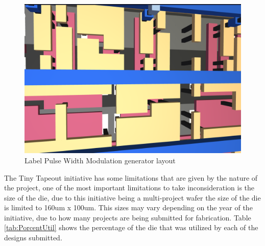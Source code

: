 \begin{figure}[H]
    \centering
        \includegraphics[width=\linewidth]{Pictures/Specific_Layout.png}
    \caption{ Label Pulse Width Modulation generator layout}\label{fig:Specific_Layout}
\end{figure}

The Tiny Tapeout initiative has some limitations that are given by the nature of the project, one of 
the most important limitations to take inconsideration is the size of the die, due to this initiative being 
a multi-project wafer the size of the die is limited to 160um x 100um. This sizes may vary depending on the 
year of the initiative, due to how many projects are being submitted for fabrication. Table \ref*{tab:PorcentUtil}
shows the percentage of the die that was utilized by each of the designs submitted.

\begin{table}[H]
    \centering
    \caption{Porcentaje utilize in length of waver per circuit}\label{tab:PorcentUtil}
    \end{table}

    